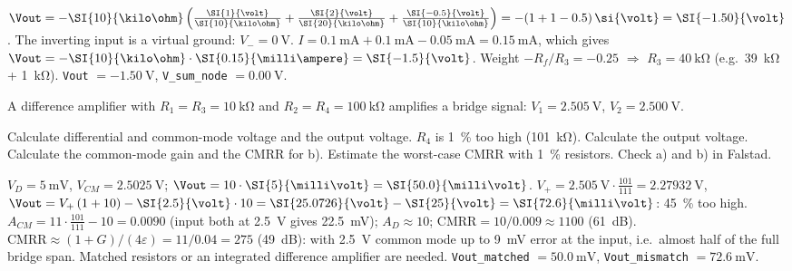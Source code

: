 \begin{solution}
\begin{talist}
\ta $\Vout = -\SI{10}{\kilo\ohm}\left(\frac{\SI{1}{\volt}}{\SI{10}{\kilo\ohm}} + \frac{\SI{2}{\volt}}{\SI{20}{\kilo\ohm}} + \frac{\SI{-0.5}{\volt}}{\SI{10}{\kilo\ohm}}\right) = -(1 + 1 - 0.5)\,\si{\volt} = \SI{-1.50}{\volt}$.
    The inverting input is a virtual ground: $V_- = \SI{0}{\volt}$.
\ta $I = \SI{0.1}{\milli\ampere} + \SI{0.1}{\milli\ampere} - \SI{0.05}{\milli\ampere} = \SI{0.15}{\milli\ampere}$,
    which gives $\Vout = -\SI{10}{\kilo\ohm}\cdot \SI{0.15}{\milli\ampere} = \SI{-1.5}{\volt}$.
\ta Weight $-R_f/R_3 = -0.25$ $\Rightarrow$ $R_3 = \SI{40}{\kilo\ohm}$ (e.g.\ \SI{39}{\kilo\ohm} + \SI{1}{\kilo\ohm}).
\ta {}\newline \texttt{Vout} $=\SI{-1.50}{\volt}$, \texttt{V\_sum\_node} $= \SI{0.00}{\volt}$.
\end{talist}
\end{solution}

\label{ex:opamp-diff}
A difference amplifier with $R_1 = R_3 = \SI{10}{\kilo\ohm}$ and $R_2 = R_4 = \SI{100}{\kilo\ohm}$
amplifies a bridge signal: $V_1 = \SI{2.505}{\volt}$, $V_2 = \SI{2.500}{\volt}$.
\begin{talist}
\ta Calculate differential and common-mode voltage and the output voltage.
\ta $R_4$ is \SI{1}{\percent} too high (\SI{101}{\kilo\ohm}). Calculate the output voltage.
\ta Calculate the common-mode gain and the CMRR for b).
\ta Estimate the worst-case CMRR with \SI{1}{\percent} resistors.
\ta Check a) and b) in Falstad.
\end{talist}

\begin{solution}
\begin{talist}
\ta $V_D = \SI{5}{\milli\volt}$, $V_{CM} = \SI{2.5025}{\volt}$; $\Vout = 10\cdot\SI{5}{\milli\volt} = \SI{50.0}{\milli\volt}$.
\ta $V_+ = \SI{2.505}{\volt}\cdot\frac{101}{111} = \SI{2.27932}{\volt}$,
    $\Vout = V_+\,(1+10) - \SI{2.5}{\volt}\cdot 10 = \SI{25.0726}{\volt}-\SI{25}{\volt} = \SI{72.6}{\milli\volt}$:
    \SI{45}{\percent} too high.
\ta $A_{CM} = 11\cdot\frac{101}{111} - 10 = 0.0090$ (input both at \SI{2.5}{\volt} gives \SI{22.5}{\milli\volt});
    $A_D\approx 10$; $\mathrm{CMRR} = 10/0.009 \approx 1100$ (\SI{61}{\deci\bel}).
\ta $\mathrm{CMRR} \approx (1+G)/(4\varepsilon) = 11/0.04 = 275$ (\SI{49}{\deci\bel}): with
    \SI{2.5}{\volt} common mode up to \SI{9}{\milli\volt} error at the input, i.e.\ almost half of the
    full bridge span. Matched resistors or an integrated difference amplifier are needed.
\ta {}\newline \texttt{Vout\_matched} $= \SI{50.0}{\milli\volt}$, \texttt{Vout\_mismatch} $= \SI{72.6}{\milli\volt}$.
\end{talist}
\end{solution}

